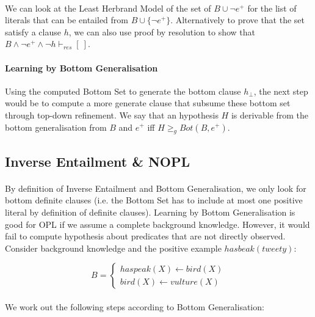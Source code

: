 \documentclass{article}
\theoremstyle{plain}
\theoremstyle{definition}
\begin{document}
\begin{multicols}{2}
\paragraph{} We can look at the Least Herbrand Model of the set of $B \cup {\lnot e^+}$ for the list of literals that can be entailed from $B \cup \{\lnot e^+\}$. Alternatively to prove that the set satisfy a clause $h$, we can also use proof by resolution to show that $B \land \lnot e^+ \land \lnot h \vdash_{res} [\ ]$.

\paragraph{Learning by Bottom Generalisation} Using the computed Bottom Set to generate the bottom clause $h_{\perp}$, the next step would be to compute a more generate clause that subsume these bottom set through top-down refinement. We say that an hypothesis $H$ is derivable from the bottom generalisation from $B$ and $e^+$ iff $H \geq_g Bot(B, e^+)$. 

\subsection{Inverse Entailment \& NOPL}

\paragraph{} By definition of Inverse Entailment and Bottom Generalisation, we only look for bottom definite clauses (i.e. the Bottom Set has to include at most one positive literal by definition of definite clauses). Learning by Bottom Generalisation is good for OPL if we assume a complete background knowledge. However, it would fail to compute hypothesis about predicates that are not directly observed. Consider background knowledge and the positive example $hasbeak(tweety)$:

\[
B = \begin{cases}
haspeak(X) \leftarrow bird(X)\\
bird(X) \leftarrow vulture(X)
\end{cases}
\]

\paragraph{} We work out the following steps according to Bottom Generalisation:


\end{multicols}
\end{document}
